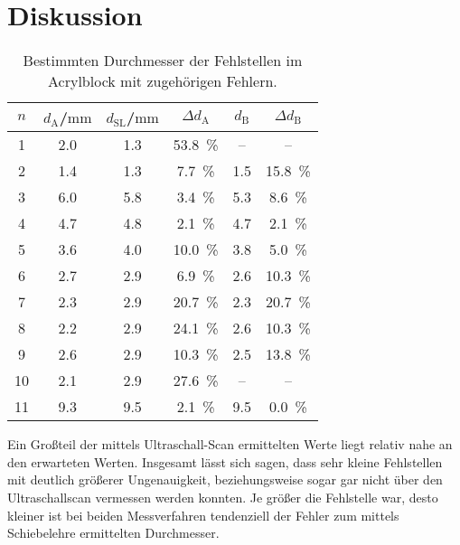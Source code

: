 \section{Diskussion}
\label{sec:Diskussion}
\begin{table}
  \centering
	\caption{Bestimmten Durchmesser der Fehlstellen im Acrylblock mit zugehörigen Fehlern.}
	\label{tab:werte_ascan}
	\begin{tabular}{cccccc}
		\toprule
		$n$ & $d_\mathrm{A}$/$\si{\milli\meter}$ & $d_{\mathrm{SL}}$/$\si{\milli\meter}$ & $\Delta d_\mathrm{A}$&$d_\mathrm{B}$&$\Delta d_\mathrm{B}$ \\
		\midrule
		1 & 2.0 & 1.3 & \SI{53.8}{\percent}&  --      & --     \\
		2 & 1.4 & 1.3 & \SI{7.7}{\percent} &   1.5     & \SI{15.8}{\percent}    \\
		3 & 6.0 & 5.8 & \SI{3.4}{\percent} &   5.3     & \SI{8.6}{\percent}    \\
		4 & 4.7 & 4.8 & \SI{2.1}{\percent} &   4.7     & \SI{2.1}{\percent}    \\
		5 & 3.6 & 4.0 & \SI{10.0}{\percent}&   3.8     & \SI{5.0}{\percent}     \\
		6 & 2.7 & 2.9 & \SI{6.9}{\percent} &   2.6     & \SI{10.3}{\percent}    \\
		7 & 2.3 & 2.9 & \SI{20.7}{\percent}&   2.3     & \SI{20.7}{\percent}     \\
		8 & 2.2 & 2.9 & \SI{24.1}{\percent}&   2.6     & \SI{10.3}{\percent}     \\
		9 & 2.6 & 2.9 & \SI{10.3}{\percent}&   2.5     & \SI{13.8}{\percent}     \\
		10 & 2.1 & 2.9 & \SI{27.6}{\percent}&  --      &--      \\
		11 & 9.3 & 9.5 & \SI{2.1}{\percent}&   9.5     & \SI{0.0}{\percent}     \\
		\bottomrule
	\end{tabular}
\end{table}
Ein Großteil der mittels Ultraschall-Scan ermittelten Werte liegt relativ nahe an den erwarteten Werten. Insgesamt lässt sich sagen, dass sehr kleine Fehlstellen mit deutlich größerer Ungenauigkeit, beziehungsweise sogar gar nicht über den Ultraschallscan vermessen werden konnten.
Je größer die Fehlstelle war, desto kleiner ist bei beiden Messverfahren tendenziell der Fehler zum mittels Schiebelehre ermittelten Durchmesser.
